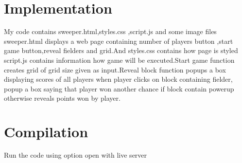 \documentclass{article}
\begin{document}
\section{Implementation}
    My code contains sweeper.html,styles.css ,script.js and some image files\\
    sweeper.html displays a web page containing number of players button ,start game button,reveal fielders and grid.And styles.css contains how page is styled\\
    script.js contains information how game will be executed.Start game function creates grid of grid size given as input.Reveal block function popups a box displaying scores of all players when player clicks on block containing fielder, popup a box saying that player won another chance if block contain powerup otherwise reveals points won by player.
\section{Compilation}
    Run the code using option open with live server
\nocite{*}    
\printbibliography 
\end{document}
